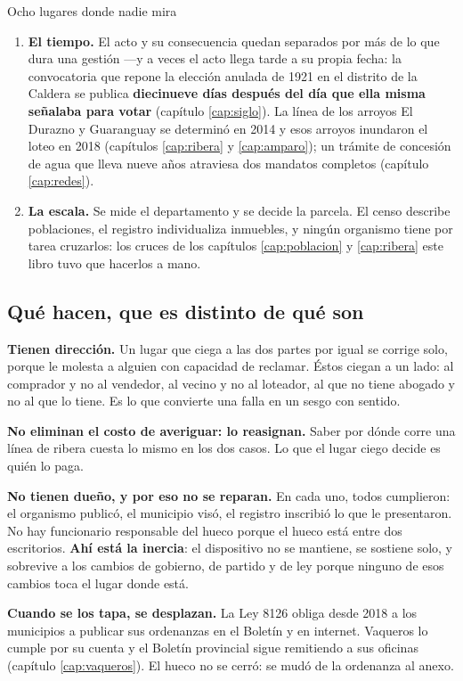 \begin{ficha}{Ocho lugares donde nadie mira}
\begin{enumerate}[leftmargin=*,nosep]
capítulo. No es información restringida: es información que no se produjo en forma consultable.
\item \textbf{El tiempo.} El acto y su consecuencia quedan separados por más de lo que dura una
gestión ---y a veces el acto llega tarde a su propia fecha: la convocatoria que repone la
elección anulada de 1921 en el distrito de la Caldera se publica \textbf{diecinueve días después
del día que ella misma señalaba para votar} (capítulo \ref{cap:siglo}). La línea de los arroyos El Durazno y Guaranguay se determinó en 2014 y esos arroyos
inundaron el loteo en 2018 (capítulos \ref{cap:ribera} y \ref{cap:amparo}); un trámite de
concesión de agua que lleva nueve años atraviesa dos mandatos completos (capítulo
\ref{cap:redes}).
\item \textbf{La escala.} Se mide el departamento y se decide la parcela. El censo describe
poblaciones, el registro individualiza inmuebles, y ningún organismo tiene por tarea cruzarlos:
los cruces de los capítulos \ref{cap:poblacion} y \ref{cap:ribera} este libro tuvo que hacerlos
a mano.
\end{enumerate}
\end{ficha}

\subsection*{Qué hacen, que es distinto de qué son}

\textbf{Tienen dirección.} Un lugar que ciega a las dos partes por igual se corrige solo,
porque le molesta a alguien con capacidad de reclamar. Éstos ciegan a un lado: al comprador y
no al vendedor, al vecino y no al loteador, al que no tiene abogado y no al que lo tiene. Es lo
que convierte una falla en un sesgo con sentido.

\textbf{No eliminan el costo de averiguar: lo reasignan.} Saber por dónde corre una línea de
ribera cuesta lo mismo en los dos casos. Lo que el lugar ciego decide es quién lo paga.

\textbf{No tienen dueño, y por eso no se reparan.} En cada uno, todos cumplieron: el organismo
publicó, el municipio visó, el registro inscribió lo que le presentaron. No hay funcionario
responsable del hueco porque el hueco está entre dos escritorios. \textbf{Ahí está la inercia}:
el dispositivo no se mantiene, se sostiene solo, y sobrevive a los cambios de gobierno, de
partido y de ley porque ninguno de esos cambios toca el lugar donde está.

\textbf{Cuando se los tapa, se desplazan.} La Ley 8126 obliga desde 2018 a los municipios a
publicar sus ordenanzas en el Boletín y en internet. Vaqueros lo cumple por su cuenta y el
Boletín provincial sigue remitiendo a sus oficinas (capítulo \ref{cap:vaqueros}). El hueco no
se cerró: se mudó de la ordenanza al anexo.

